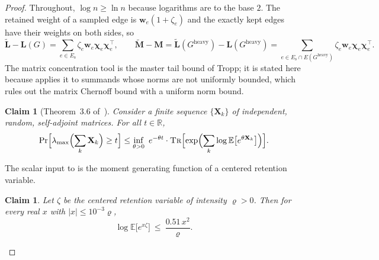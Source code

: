 \documentclass[11pt]{article}
\newtheorem{claim}[theorem]{Claim}
\theoremstyle{remark}
\newcommand{\cchi}{{\boldsymbol\chi}}
\newcommand{\LL}{\mathbf L}
\newcommand{\LLtil}{{\widetilde{\LL}}}
\newcommand{\MM}{\mathbf M}
\newcommand{\MMtil}{{\widetilde{\MM}}}
\newcommand{\ww}{\mathbf w}
\newcommand{\XX}{\mathbf X}
\newcommand{\Gh}{G^{\mathrm{heavy}}}
\newcommand{\R}{\mathbb R}
\newcommand{\Ex}{\mathbb E}
\newcommand{\tr}{\textsc{Tr}}
\begin{document}
\begin{proof}
Throughout, $\log n\ge\ln n$ because logarithms are to the base $2$.
The retained weight of a sampled edge is $\ww_e(1+\zeta_e)$ and the exactly
kept edges have their weights on both sides, so
\begin{equation}\label{eq:bernoulli-centered}
\LLtil-\LL(G)=\sum_{e\in E_{\mathrm{s}}}\zeta_e\ww_e\cchi_e\cchi_e^{\top},
\qquad
\MMtil-\MM=\LLtil(\Gh)-\LL(\Gh)
=\sum_{e\in E_{\mathrm{s}}\cap E(\Gh)}\zeta_e\ww_e\cchi_e\cchi_e^{\top}.
\end{equation}
The matrix concentration tool is the master tail bound of Tropp; it is
stated here because  applies it to summands
whose norms are not uniformly bounded, which rules out the matrix Chernoff
bound with a uniform norm bound.

\begin{claim}[Theorem~3.6 of~\cite{T12:journal}]\label{clm:master}
Consider a finite sequence $\{\XX_k\}$ of independent, random,
self-adjoint matrices.
For all $t\in\R$,
\[
\Pr\Bigl[\lambda_{\max}\Bigl(\sum_k\XX_k\Bigr)\ge t\Bigr]
\le\inf_{\theta>0}\ e^{-\theta t}\cdot
\tr\Bigl[\exp\Bigl(\sum_k\log\Ex\bigl[e^{\theta\XX_k}\bigr]\Bigr)\Bigr].
\]
\end{claim}

The scalar input to  is the moment generating function of
a centered retention variable.

\begin{claim}\label{clm:mgf}
Let $\zeta$ be the centered retention variable of intensity $\varrho>0$.
Then for every real $x$ with $|x|\le10^{-3}\varrho$,
\[
\log\Ex\bigl[e^{x\zeta}\bigr]\ \le\ \frac{0.51\,x^{2}}{\varrho}.
\]
\end{claim}


\end{proof}
\end{document}
